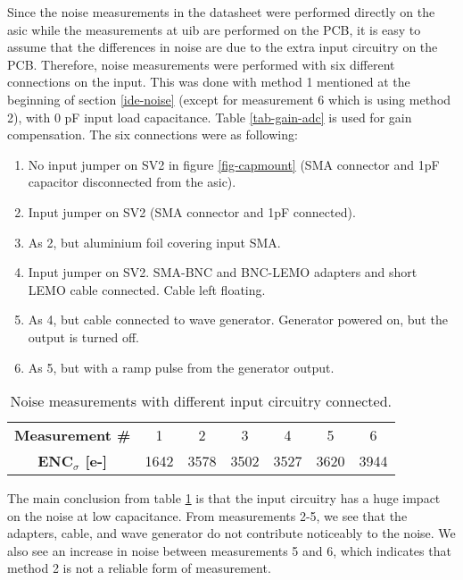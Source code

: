 \documentclass[../main/thesis.tex]{subfiles}
\begin{document}
Since the noise measurements in the datasheet were performed directly on the \gls{asic} while the measurements at \gls{uib} are performed on the \gls{PCB}, it is easy to assume that the differences in noise are due to the extra input circuitry on the \gls{PCB}. Therefore, noise measurements were performed with six different connections on the input. This was done with method 1 mentioned at the beginning of section \ref{ide-noise} (except for measurement 6 which is using method 2), with 0 pF input load capacitance. Table \ref{tab-gain-adc} is used for gain compensation. The six connections were as following:
\begin{enumerate}  
	\item No input jumper on SV2 in figure \ref{fig-capmount} (SMA connector and 1pF capacitor disconnected from the \gls{asic}).
	\item Input jumper on SV2 (SMA connector and 1pF connected).
	\item As 2, but aluminium foil covering input SMA.
	\item Input jumper on SV2. SMA-BNC and BNC-LEMO adapters and short LEMO cable connected. Cable left floating.
	\item As 4, but cable connected to wave generator. Generator powered on, but the output is turned off.
	\item As 5, but with a ramp pulse from the generator output.   
\end{enumerate}

\begin{table}[h!]
	\begin{center}
		\caption{Noise measurements with different input circuitry connected.}
		\label{tab-noise-input}
		\begin{tabular}{ccccccc}\toprule
			\textbf{Measurement \#}      & 1    & 2    & 3    & 4    & 5    & 6   \\ 
			\textbf{ENC$_\sigma$ [e-]} & 1642 & 3578 & 3502 & 3527 & 3620 & 3944   \\ \bottomrule
		\end{tabular}
	\end{center}
\end{table}

The main conclusion from table \ref{tab-noise-input} is that the input circuitry has a huge impact on the noise at low capacitance. From measurements 2-5, we see that the adapters, cable, and wave generator do not contribute noticeably to the noise. We also see an increase in noise between measurements 5 and 6, which indicates that method 2 is not a reliable form of measurement. 
\end{document}
